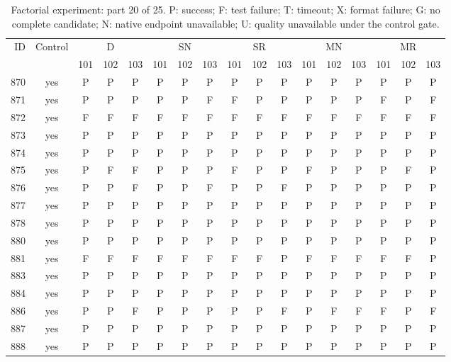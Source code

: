\begin{table}[p]\centering\footnotesize
\setlength{\tabcolsep}{3pt}
\caption{Factorial experiment: part 20 of 25. P: success; F: test failure; T: timeout; X: format failure; G: no complete candidate; N: native endpoint unavailable; U: quality unavailable under the control gate.}
\begin{tabular*}{\textwidth}{@{\extracolsep{\fill}}rcccccccccccccccc}\toprule
ID & Control & \multicolumn{3}{c}{D} & \multicolumn{3}{c}{SN} & \multicolumn{3}{c}{SR} & \multicolumn{3}{c}{MN} & \multicolumn{3}{c}{MR}\\
\cmidrule(lr){3-5}\cmidrule(lr){6-8}\cmidrule(lr){9-11}\cmidrule(lr){12-14}\cmidrule(lr){15-17}
 & & 101 & 102 & 103 & 101 & 102 & 103 & 101 & 102 & 103 & 101 & 102 & 103 & 101 & 102 & 103\\\midrule
870 & yes & P & P & P & P & P & P & P & P & P & P & P & P & P & P & P\\
871 & yes & P & P & P & P & P & F & F & P & P & P & P & P & F & P & F\\
872 & yes & F & F & F & F & F & F & F & F & F & F & F & F & F & F & F\\
873 & yes & P & P & P & P & P & P & P & P & P & P & P & P & P & P & P\\
874 & yes & P & P & P & P & P & P & P & P & P & P & P & P & P & P & P\\
875 & yes & P & F & F & P & P & P & F & P & P & F & P & P & P & F & P\\
876 & yes & P & P & F & P & P & F & P & P & F & P & P & P & P & P & P\\
877 & yes & P & P & P & P & P & P & P & P & P & P & P & P & P & P & P\\
878 & yes & P & P & P & P & P & P & P & P & P & P & P & P & P & P & P\\
880 & yes & P & P & P & P & P & P & P & P & P & P & P & P & P & P & P\\
881 & yes & F & F & F & F & F & F & F & F & P & F & F & F & F & F & P\\
883 & yes & P & P & P & P & P & P & P & P & P & P & P & P & P & P & P\\
884 & yes & P & P & P & P & P & P & P & P & P & P & P & P & P & P & P\\
886 & yes & P & P & F & P & P & P & P & P & F & P & F & F & F & P & F\\
887 & yes & P & P & P & P & P & P & P & P & P & P & P & P & P & P & P\\
888 & yes & P & P & P & P & P & P & P & P & P & P & P & P & P & P & P\\

\end{tabular*}
\end{table}
